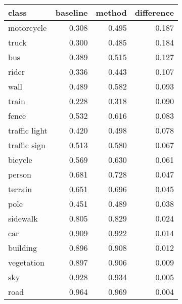 \begin{tabular}{lrrr}
\toprule
class & baseline & method & difference \\
\midrule
motorcycle & 0.308 & 0.495 & 0.187 \\
truck & 0.300 & 0.485 & 0.184 \\
bus & 0.389 & 0.515 & 0.127 \\
rider & 0.336 & 0.443 & 0.107 \\
wall & 0.489 & 0.582 & 0.093 \\
train & 0.228 & 0.318 & 0.090 \\
fence & 0.532 & 0.616 & 0.083 \\
traffic light & 0.420 & 0.498 & 0.078 \\
traffic sign & 0.513 & 0.580 & 0.067 \\
bicycle & 0.569 & 0.630 & 0.061 \\
person & 0.681 & 0.728 & 0.047 \\
terrain & 0.651 & 0.696 & 0.045 \\
pole & 0.451 & 0.489 & 0.038 \\
sidewalk & 0.805 & 0.829 & 0.024 \\
car & 0.909 & 0.922 & 0.014 \\
building & 0.896 & 0.908 & 0.012 \\
vegetation & 0.897 & 0.906 & 0.009 \\
sky & 0.928 & 0.934 & 0.005 \\
road & 0.964 & 0.969 & 0.004 \\
\bottomrule
\end{tabular}
